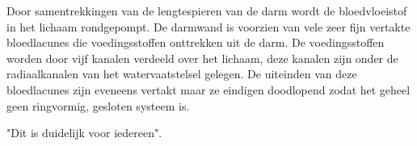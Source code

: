 Door samentrekkingen van de lengtespieren van de darm wordt de bloedvloeistof in het lichaam rondgepompt.
De darmwand is voorzien van vele zeer fijn vertakte bloedlacunes die voedingsstoffen onttrekken uit de darm.
De voedingsstoffen worden door vijf kanalen verdeeld over het lichaam, deze kanalen zijn onder de radiaalkanalen van het watervaatstelsel gelegen.
De uiteinden van deze bloedlacunes zijn eveneens vertakt maar ze eindigen doodlopend zodat het geheel geen ringvormig, gesloten systeem is.

"Dit is duidelijk voor iedereen".